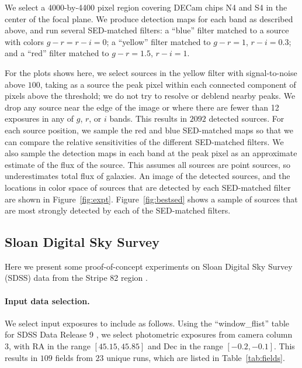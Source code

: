 \documentclass[letterpaper,preprint]{aastex62}
\newcommand{\tabref}[1]{\mbox{Table~\ref{#1}}}
\newcommand{\figref}[1]{\mbox{Figure~\ref{#1}}}
\begin{document}
We select a 4000-by-4400 pixel region covering DECam chips N4 and S4
in the center of the focal plane.  We produce detection maps for each
band as described above, and run several SED-matched filters: a
``blue'' filter matched to a source with colors $g - r = r - i = 0$; a
``yellow'' filter matched to $g - r = 1$, $r - i = 0.3$; and a ``red''
filter matched to $g - r = 1.5$, $r - i = 1$.

For the plots shows here, we select sources in the yellow filter with
signal-to-noise above $100$, taking as a source the peak pixel within
each connected component of pixels above the threshold; we do not try
to resolve or deblend nearby peaks.  We drop any source near the edge
of the image or where there are fewer than 12 exposures in any of $g$,
$r$, or $i$ bands.  This results in $2092$ detected sources.  For each
source position, we sample the red and blue SED-matched maps so that
we can compare the relative sensitivities of the different SED-matched
filters.  We also sample the detection maps in each band at the peak
pixel as an approximate estimate of the flux of the source.  This
assumes all sources are point sources, so underestimates total flux of
galaxies.  An image of the detected sources, and the locations in
color space of sources that are detected by each SED-matched filter
are shown in \figref{fig:expt}.  \figref{fig:bestsed} shows a sample
of sources that are most strongly detected by each of the SED-matched
filters.




\subsection{Sloan Digital Sky Survey}

Here we present some proof-of-concept experiments on Sloan Digital Sky
Survey (SDSS) data from the Stripe 82 region \cite{sdss}.


\paragraph{Input data selection.}
We select input exposures to include as follows.  Using the
``window\_flist'' table for SDSS Data Release 9 \cite{dr9}, we select
photometric exposures from camera column 3, with RA in the range
$[45.15, 45.85]$ and Dec in the range $[-0.2, -0.1]$.  This results in
$109$ fields from $23$ unique runs, which are listed in
\tabref{tab:fields}.
\end{document}
